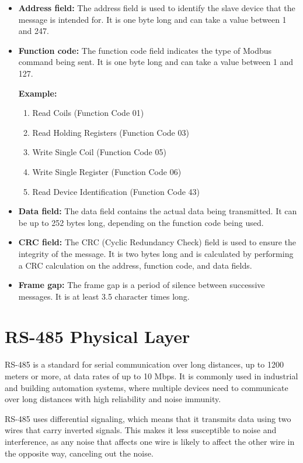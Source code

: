 \documentclass[12pt]{article}
\begin{document}
\begin{itemize}

\item \textbf{Address field:} The address field is used to identify the slave device that the message is intended for. It is one byte long and can take a value between 1 and 247.

\item \textbf{Function code:} The function code field indicates the type of Modbus command being sent. It is one byte long and can take a value between 1 and 127.

\textbf{Example:}
\begin{enumerate}
\item Read Coils (Function Code 01)
\item Read Holding Registers (Function Code 03)
\item Write Single Coil (Function Code 05)
\item Write Single Register (Function Code 06)
\item Read Device Identification (Function Code 43)
\end{enumerate}

\item \textbf{Data field:} The data field contains the actual data being transmitted. It can be up to 252 bytes long, depending on the function code being used.

\item \textbf{CRC field:} The CRC (Cyclic Redundancy Check) field is used to ensure the integrity of the message. It is two bytes long and is calculated by performing a CRC calculation on the address, function code, and data fields.

\item \textbf{Frame gap:} The frame gap is a period of silence between successive messages. It is at least 3.5 character times long.
\end{itemize}

\section{RS-485 Physical Layer}
RS-485 is a standard for serial communication over long distances, up to 1200 meters or more, at data rates of up to 10 Mbps. It is commonly used in industrial and building automation systems, where multiple devices need to communicate over long distances with high reliability and noise immunity.

RS-485 uses differential signaling, which means that it transmits data using two wires that carry inverted signals. This makes it less susceptible to noise and interference, as any noise that affects one wire is likely to affect the other wire in the opposite way, canceling out the noise.
\end{document}
